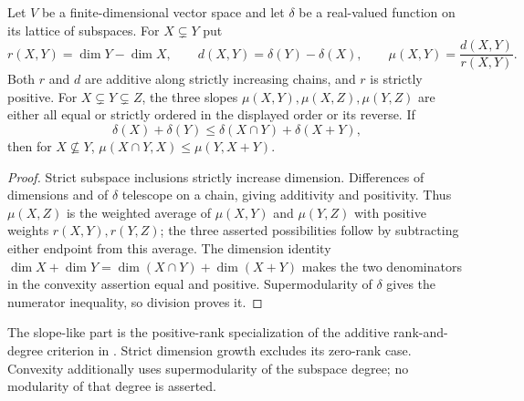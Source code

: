 \begin{lemma}
\label{lem:subspace-convex-slopes}
\leanok
Let $V$ be a finite-dimensional vector space and let $\delta$ be a
real-valued function on its lattice of subspaces. For $X\subsetneq Y$ put
\[
 r(X,Y)=\dim Y-\dim X,\qquad d(X,Y)=\delta(Y)-\delta(X),\qquad
 \mu(X,Y)=\frac{d(X,Y)}{r(X,Y)}.
\]
Both $r$ and $d$ are additive along strictly increasing chains, and $r$
is strictly positive. For $X\subsetneq Y\subsetneq Z$, the three slopes
$\mu(X,Y),\mu(X,Z),\mu(Y,Z)$ are either all equal or strictly ordered
in the displayed order or its reverse. If
\[
 \delta(X)+\delta(Y)\leq\delta(X\cap Y)+\delta(X+Y),
\]
then for $X\not\subseteq Y$,
$\mu(X\cap Y,X)\leq\mu(Y,X+Y)$.
\end{lemma}
\begin{proof}
Strict subspace inclusions strictly increase dimension. Differences of
dimensions and of $\delta$ telescope on a chain, giving additivity and
positivity. Thus $\mu(X,Z)$ is the weighted average of $\mu(X,Y)$ and
$\mu(Y,Z)$ with positive weights $r(X,Y),r(Y,Z)$; the three asserted
possibilities follow by subtracting either endpoint from this average.
The dimension identity
$\dim X+\dim Y=\dim(X\cap Y)+\dim(X+Y)$ makes the two denominators
in the convexity assertion equal and positive. Supermodularity of
$\delta$ gives the numerator inequality, so division proves it.
\end{proof}

\begin{remark}
The slope-like part is the positive-rank specialization of the additive
rank-and-degree criterion in \cite[Section 4.3]{chen-jeannin}. Strict
dimension growth excludes its zero-rank case. Convexity additionally
uses supermodularity of the subspace degree; no modularity of that
degree is asserted.
\end{remark}

